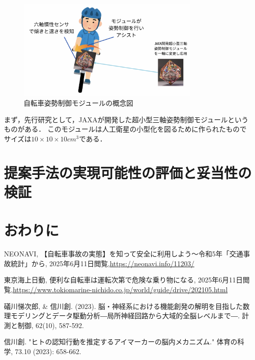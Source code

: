 \documentclass[uplatex,dvipdfmx]{jsarticle}
\begin{document}
\begin{figure}[H]
    \centering
    \includegraphics[width=0.8\textwidth]{fig/moduleGainenn.png}
    \caption{自転車姿勢制御モジュールの概念図}
    \label{fig:moduleGainenn}
\end{figure}

まず，先行研究として，JAXAが開発した超小型三軸姿勢制御モジュールというものがある．
このモジュールは人工衛星の小型化を図るために作られたものでサイズは$10×10×10 {cm}^3$である．





\section{提案手法の実現可能性の評価と妥当性の検証}
%

\section{おわりに}




\begin{thebibliography}{9}

 NEONAVI, 【自転車事故の実態】を知って安全に利用しよう～令和5年「交通事故統計」から, 
2025年6月11日閲覧,\url{https://neonavi.info/11203/}

 東京海上日動, 便利な自転車は運転次第で危険な乗り物になる, 
2025年6月11日閲覧,\url{https://www.tokiomarine-nichido.co.jp/world/guide/drive/202105.html}

 礒川悌次郎, \& 信川創. (2023). 脳・神経系における機能創発の解明を目指した数理モデリングとデータ駆動分析―局所神経回路から大域的全脳レベルまで―. 計測と制御, 62(10), 587-592.

  信川創. "ヒトの認知行動を推定するアイマーカーの脳内メカニズム." 体育の科学, 73.10 (2023): 658-662.
\end{thebibliography}
\end{document}
